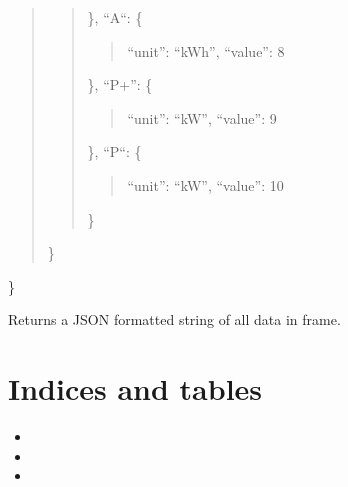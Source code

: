 \documentclass[letterpaper,10pt,english]{sphinxmanual}
\begin{document}
\begin{fulllineitems}
\begin{fulllineitems}
\begin{quote}
\begin{quote}
\begin{description}
\end{description}

\},
“A\sphinxhyphen{}“: \{
\begin{quote}

“unit”: “kWh”,
“value”: 8
\end{quote}

\},
“P+”: \{
\begin{quote}

“unit”: “kW”,
“value”: 9
\end{quote}

\},
“P\sphinxhyphen{}“: \{
\begin{quote}

“unit”: “kW”,
“value”: 10
\end{quote}

\}
\end{quote}

\}
\end{quote}

\}

\end{fulllineitems}


\begin{fulllineitems}
\label{\detokenize{metermeasurement:OmniPower.OmniPower.MeterMeasurement.json_dump}}
Returns a JSON formatted string of all data in frame.

\end{fulllineitems}


\end{fulllineitems}



\chapter{Indices and tables}
\label{\detokenize{index:indices-and-tables}}\begin{itemize}
\item {} 

\item {} 

\item {} 

\end{itemize}
\end{document}
